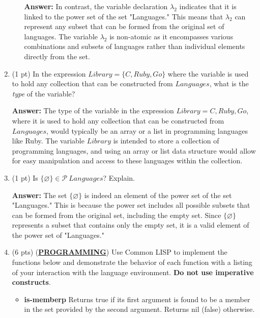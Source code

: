 \documentclass[12pt]{article}
\begin{document}
\begin{spacing}{1.5}
\begin{enumerate}
\begin{enumerate}
		      	      \textbf{Answer:} In contrast, the variable declaration $\lambda_2$ indicates that it is linked to the power set of the set "Languages." This means that $\lambda_2$ can represent any subset that can be formed from the original set of languages. The variable $\lambda_2$ is non-atomic as it encompasses various combinations and subsets of languages rather than individual elements directly from the set.\\

		      \end{enumerate}
		      		      		      		      
		\item (1 pt) In the expression $Library = \{C, Ruby, Go\}$ where the variable is used to hold any collection that can be constructed from $Languages$, what is the \textit{type} of the variable?
		      		      		      		      
		      \textbf{Answer:} The type of the variable in the expression $Library = {C, Ruby, Go}$, where it is used to hold any collection that can be constructed from $Languages$, would typically be an array or a list in programming languages like Ruby. The variable $Library$ is intended to store a collection of programming languages, and using an array or list data structure would allow for easy manipulation and access to these languages within the collection.\\
		      		      		      		                  
		\item (1 pt) Is $\{\varnothing\} \in \mathcal{P} \: Languages$? Explain.
		      		      		      		      
		      \textbf{Answer:} The set $\{\varnothing\}$ is indeed an element of the power set of the set "Languages." This is because the power set includes all possible subsets that can be formed from the original set, including the empty set. Since $\{\varnothing\}$ represents a subset that contains only the empty set, it is a valid element of the power set of "Languages."\\
		      		      		      		                  
		\item (6 pts) (\textbf{\uline{{PROGRAMMING}}}) Use Common LISP to implement the functions below and demonstrate the behavior of each function with a listing of your interaction with the language environment. \textbf{Do not use imperative constructs}.
		      		      		      		      
		      \begin{itemize}
		      	\item \textbf{is-memberp} Returns true if its first argument is found to be a member in the set provided by the second argument. Returns nil (false) otherwise.


\end{itemize}
\end{enumerate}
\end{spacing}
\end{document}
